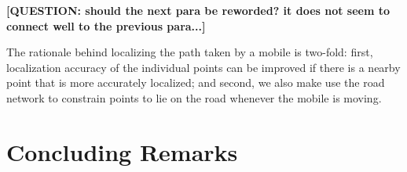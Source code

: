 \documentclass[conference, 10pt]{IEEEtran}
\begin{document}
 \textbf{[QUESTION: should the next para be reworded? it does not seem to connect well to the previous para...]} 

The rationale behind localizing the path taken by a mobile is two-fold: first,
localization accuracy of the individual points can be improved if there is a
nearby point that is more accurately localized; and second, we also make use the
road network to constrain points to lie on the road whenever the mobile is
moving. 



\section{Concluding Remarks}
\label{sec:concl}





%
%    

{%


}
\end{document}
